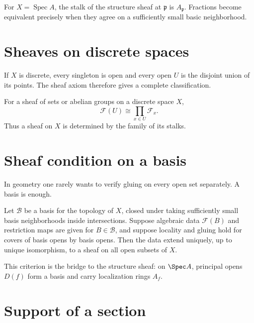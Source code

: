 \begin{example}\label{ex:vi13-expand-03}
For $X=\operatorname{Spec}A$, the stalk of the structure sheaf at $\mathfrak p$ is $A_{\mathfrak p}$.  Fractions become equivalent precisely when they agree on a sufficiently small basic neighborhood.
\end{example}
\section{Sheaves on discrete spaces}

If $X$ is discrete, every singleton is open and every open $U$ is the disjoint union of its
points.  The sheaf axiom therefore gives a complete classification.

\begin{theorem}
For a sheaf of sets or abelian groups on a discrete space $X$,
\[
\mathcal F(U)\cong\prod_{x\in U}\mathcal F_x.
\]
Thus a sheaf on $X$ is determined by the family of its stalks.
\end{theorem}



\section{Sheaf condition on a basis}

In geometry one rarely wants to verify gluing on every open set separately.  A basis is
enough.

\begin{theorem}
Let $\mathcal B$ be a basis for the topology of $X$, closed under taking sufficiently small
basis neighborhoods inside intersections.  Suppose algebraic data $\mathcal F(B)$ and
restriction maps are given for $B\in\mathcal B$, and suppose locality and gluing hold for
covers of basis opens by basis opens.  Then the data extend uniquely, up to unique
isomorphism, to a sheaf on all open subsets of $X$.
\end{theorem}



This criterion is the bridge to the structure sheaf: on $\Spec A$, principal opens $D(f)$
form a basis and carry localization rings $A_f$.

\section{Support of a section}


